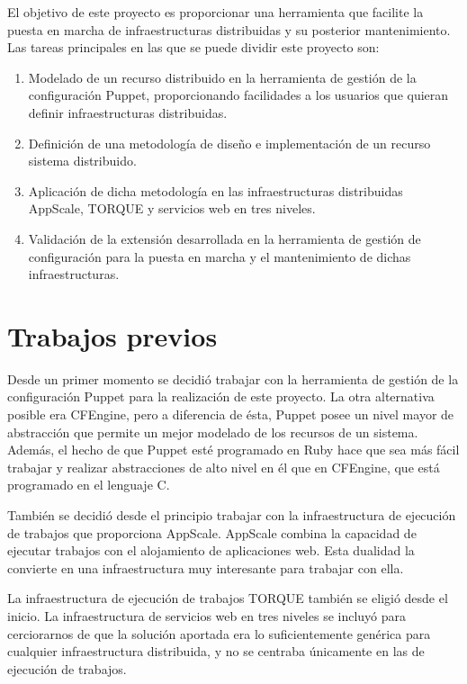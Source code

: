 El objetivo de este proyecto es proporcionar una herramienta que facilite la puesta en marcha de infraestructuras distribuidas y su posterior mantenimiento. Las tareas principales en las que se puede dividir este proyecto son:

\begin{enumerate}
\item Modelado de un recurso distribuido en la herramienta de gestión de la configuración Puppet, proporcionando facilidades a los usuarios que quieran definir infraestructuras distribuidas.
\item Definición de una metodología de diseño e implementación de un recurso sistema distribuido.
\item Aplicación de dicha metodología en las infraestructuras distribuidas AppScale, TORQUE y servicios web en tres niveles.
\item Validación de la extensión desarrollada en la herramienta de gestión de configuración para la puesta en marcha y el mantenimiento de dichas infraestructuras.
\end{enumerate}


\section{Trabajos previos}

Desde un primer momento se decidió trabajar con la herramienta de gestión de la configuración Puppet para la realización de este proyecto. La otra alternativa posible era CFEngine, pero a diferencia de ésta, Puppet posee un nivel mayor de abstracción que permite un mejor modelado de los recursos de un sistema. Además, el hecho de que Puppet esté programado en Ruby hace que sea más fácil trabajar y realizar abstracciones de alto nivel en él que en CFEngine, que está programado en el lenguaje C.

También se decidió desde el principio trabajar con la infraestructura de ejecución de trabajos que proporciona AppScale. AppScale combina la capacidad de ejecutar trabajos con el alojamiento de aplicaciones web. Esta dualidad la convierte en una infraestructura muy interesante para trabajar con ella.

La infraestructura de ejecución de trabajos TORQUE también se eligió desde el inicio. La infraestructura de servicios web en tres niveles se incluyó para cerciorarnos de que la solución aportada era lo suficientemente genérica para cualquier infraestructura distribuida, y no se centraba únicamente en las de ejecución de trabajos.


